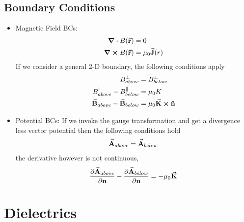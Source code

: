 \documentclass[12pt, oneside]{book}
\begin{document}
\section{Boundary Conditions}
\begin{tcolorbox}[colback=yellow!5!white,colframe=yellow!50!black]
	\begin{itemize}
	\item Magnetic Field BCs:	\begin{align}
			\div{B}(\va{r})&=0 \\
			\curl{B}(\va{r})&=\mu_0 \va{J}(r)
		\end{align}
		If we consider a general 2-D boundary, the following conditions apply
		\begin{align}
			B_{above}^{\perp}&=B_{below}^{\perp} \\
			B_{above}^{\parallel}-B_{below}^{\parallel}&=\mu_0 K \\
			\va{B}_{above}-\va{B}_{below}&=\mu_0 \va{K}\cross \vu{n}
		\end{align}
	\item Potential BCs:
	If we invoke the gauge transformation and get a divergence less vector potential then the following conditions hold
	\begin{equation}
			\va{A}_{above}=\va{A}_{below}  
	\end{equation}
the derivative however is not continuous,
	\begin{equation}
		\pdv{\va{A}_{above}}{\textbf{n}}-\pdv{\va{A}_{below}}{\textbf{n}}=-\mu_0 \va{K}
	\end{equation}
	\end{itemize}
\end{tcolorbox}

\chapter{Dielectrics}
\end{document}
